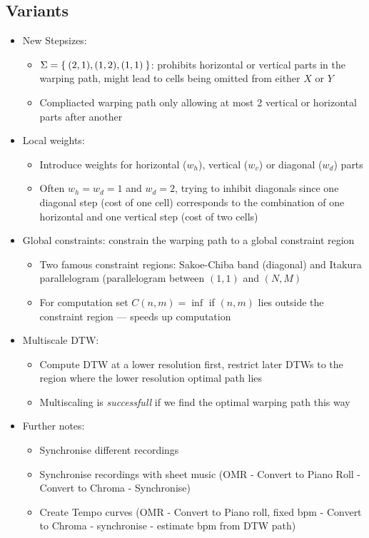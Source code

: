 \documentclass[fleqn,12pt]{scrartcl}
\begin{document}
\subsection{Variants}
\begin{itemize}
	\item
		New Stepsizes:
		\begin{itemize}
			\item
				$\Sigma = \Set{(2,1),(1,2),(1,1)}$: prohibits horizontal or vertical parts in the warping path, might lead to cells being omitted from either $X$ or $Y$
			\item
				Compliacted warping path only allowing at most 2 vertical or horizontal parts after another
		\end{itemize}
	\item
		Local weights:
		\begin{itemize}
			\item
				Introduce weights for horizontal ($w_h$), vertical ($w_v$) or diagonal ($w_d$) parts
			\item
				Often $w_h = w_d = 1$ and $w_d = 2$, trying to inhibit diagonals since one diagonal step (cost of one cell) corresponds to the combination of one horizontal and one vertical step (cost of two cells)
		\end{itemize}
	\item
		Global constraints: constrain the warping path to a global constraint region
		\begin{itemize}
			\item
				Two famous constraint regions: Sakoe-Chiba band (diagonal) and Itakura parallelogram (parallelogram between $(1,1)$ and $(N,M)$
			\item
				For computation set $C(n,m) = \inf$ if $(n,m)$ lies outside the constraint region --- speeds up computation
		\end{itemize}

	\item
		Multiscale DTW:
		\begin{itemize}
			\item
				Compute DTW at a lower resolution first, restrict later DTWs to the region where the lower resolution optimal path lies
			\item
				Multiscaling is \textit{successfull} if we find the optimal warping path this way
		\end{itemize}

	\item
		Further notes:
		\begin{itemize}
			\item
				Synchronise different recordings
			\item
				Synchronise recordings with sheet music (OMR - Convert to Piano Roll - Convert to Chroma - Synchronise)
			\item
				Create Tempo curves (OMR - Convert to Piano roll, fixed bpm - Convert to Chroma - synchronise - estimate bpm from DTW path)
		\end{itemize}

\end{itemize}
\end{document}
